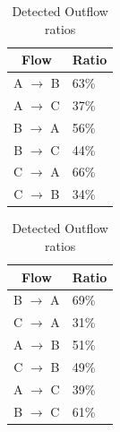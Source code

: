 \documentclass{IEEEtran}
\begin{document}
\begin{table}
    \begin{minipage}{.5\linewidth}
 
        \centering   
        \caption{Detected Inflow ratios}
        \label{tab:sniffedinflowratios}
        \begin{tabular}{|c|l|}
        \hline
        Flow               & Ratio \\ \hline
        A $\rightarrow$ B  & 63\%       \\ \hline
        A $\rightarrow$ C  & 37\%       \\ \hline
        B $\rightarrow$ A  & 56\%       \\ \hline
        B $\rightarrow$ C  & 44\%       \\ \hline
        C $\rightarrow$ A  & 66\%       \\ \hline
        C $\rightarrow$ B  & 34\%       \\ \hline
        \end{tabular}

    \end{minipage}%
    \begin{minipage}{.5\linewidth}
    
        \centering
        \caption{Detected Outflow ratios}
        \label{tab:sniffedoutflowratios}
        \begin{tabular}{|c|l|}
        \hline
        Flow               & Ratio      \\ \hline
        B $\rightarrow$ A  & 69\%       \\ \hline
        C $\rightarrow$ A  & 31\%       \\ \hline
        A $\rightarrow$ B  & 51\%       \\ \hline
        C $\rightarrow$ B  & 49\%       \\ \hline
        A $\rightarrow$ C  & 39\%       \\ \hline
        B $\rightarrow$ C  & 61\%       \\ \hline
        \end{tabular}

    \end{minipage} 
\end{table}
\end{document}
